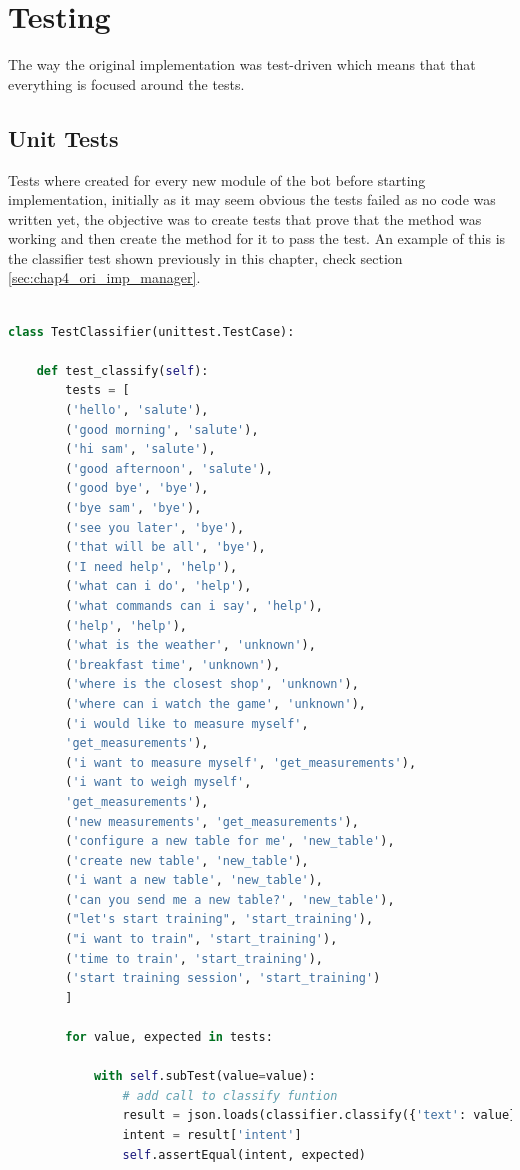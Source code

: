 \section{Testing}\label{sec:chap4_test}

The way the original implementation was test-driven which means that that everything is focused around the tests.

\subsection{Unit Tests}\label{sec:chap4_test_unit}

Tests where created for every new module of the bot before starting implementation, initially as it may seem obvious the tests failed as no code was written yet, the objective was to create tests that prove that the method was working and then create the method for it to pass the test. An example of this is the classifier test shown previously in this chapter, check section  \ref{sec:chap4_ori_imp_manager}.

\begin{lstlisting}[language=Python,caption={Test for Classifier},captionpos=b]

class TestClassifier(unittest.TestCase):

	def test_classify(self):
		tests = [
		('hello', 'salute'),
		('good morning', 'salute'),
		('hi sam', 'salute'),
		('good afternoon', 'salute'),
		('good bye', 'bye'),
		('bye sam', 'bye'),
		('see you later', 'bye'),
		('that will be all', 'bye'),
		('I need help', 'help'),
		('what can i do', 'help'),
		('what commands can i say', 'help'),
		('help', 'help'),
		('what is the weather', 'unknown'),
		('breakfast time', 'unknown'),
		('where is the closest shop', 'unknown'),
		('where can i watch the game', 'unknown'),
		('i would like to measure myself',
		'get_measurements'),
		('i want to measure myself', 'get_measurements'),
		('i want to weigh myself',
		'get_measurements'),
		('new measurements', 'get_measurements'),
		('configure a new table for me', 'new_table'),
		('create new table', 'new_table'),
		('i want a new table', 'new_table'),
		('can you send me a new table?', 'new_table'),
		("let's start training", 'start_training'),
		("i want to train", 'start_training'),
		('time to train', 'start_training'),
		('start training session', 'start_training')
		]
		
		for value, expected in tests:
		
			with self.subTest(value=value):
				# add call to classify funtion
				result = json.loads(classifier.classify({'text': value}))
				intent = result['intent']
				self.assertEqual(intent, expected)

\end{lstlisting}

